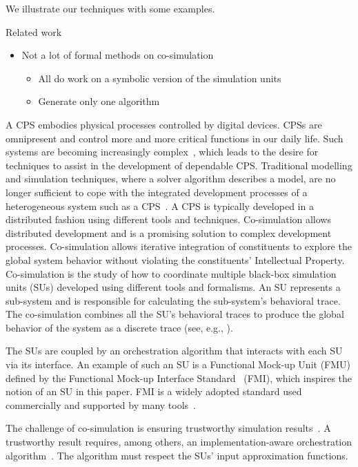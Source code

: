   We illustrate our techniques with some examples.
  
  Related work
  \begin{itemize}
    \item Not a lot of formal methods on co-simulation
    \begin{itemize}
      \item All do work on a symbolic version of the simulation units
      \item Generate only one algorithm
    \end{itemize}
  \end{itemize}

A CPS embodies physical processes controlled by digital devices.
CPSs are omnipresent and control more and more critical functions in our daily life.
Such systems are becoming increasingly complex~\cite{4519604}, which leads to the desire for techniques to assist in the development of dependable CPS.
Traditional modelling and simulation techniques, where a solver algorithm describes a model, are no longer sufficient to cope with the integrated development processes of a heterogeneous system such as a CPS~\cite{FMI2014}.
A CPS is typically developed in a distributed fashion using different tools and techniques. 
Co-simulation allows distributed development and is a promising solution to complex development processes.
Co-simulation allows iterative integration of constituents to explore the global system behavior without violating the constituents' Intellectual Property. 
Co-simulation is the study of how to coordinate multiple black-box simulation units (SUs) developed using different tools and formalisms.
An SU represents a sub-system and is responsible for calculating the sub-system's behavioral trace.
The co-simulation combines all the SU's behavioral traces to produce the global behavior of the system as a discrete trace (see, e.g., \cite{Kubler2000,Gomes2018}).

The SUs are coupled by an orchestration algorithm that interacts with each SU via its interface.
An example of such an SU is a Functional Mock-up Unit (FMU) defined by the Functional Mock-up Interface Standard~\cite{FMI2014} (FMI), which inspires the notion of an SU in this paper. FMI is a widely adopted standard used commercially and supported by many tools~\cite{Tools_FMI}.

The challenge of co-simulation is ensuring trustworthy simulation results~\cite{Gomes2018}. 
A trustworthy result requires, among others, an implementation-aware orchestration algorithm~\cite{Gomes2019,Oakes2021,Gomes2018f,Schweizer2015c,hansen_verification_2021}.
The algorithm must respect the SUs' input approximation functions.

